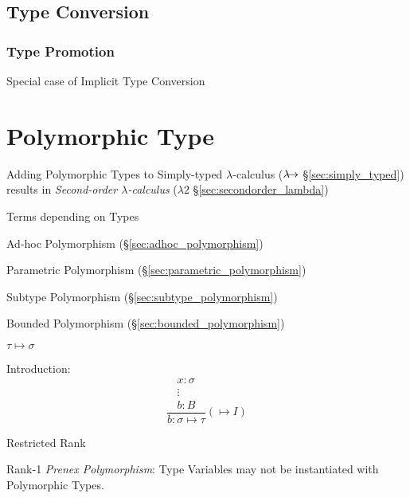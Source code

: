 \subsection{Type Conversion}\label{sec:type_conversion}

\subsubsection{Type Promotion}\label{sec:type_promotion}

Special case of Implicit Type Conversion



\section{Polymorphic Type}\label{sec:polymorphic_type}

Adding Polymorphic Types to Simply-typed $\lambda$-calculus
($\lambda\kern-5pt\rightarrow$ \S\ref{sec:simply_typed}) results in
\emph{Second-order $\lambda$-calculus} ($\lambda2$
\S\ref{sec:secondorder_lambda})

Terms depending on Types


Ad-hoc Polymorphism (\S\ref{sec:adhoc_polymorphism})

Parametric Polymorphism (\S\ref{sec:parametric_polymorphism})

Subtype Polymorphism (\S\ref{sec:subtype_polymorphism})

Bounded Polymorphism (\S\ref{sec:bounded_polymorphism})


\asterism


$\tau \mapsto \sigma$

Introduction:
\[
  {
  \frac{
    \begin{matrix}
      x : \sigma \\
      \vdots \\
      b : B
    \end{matrix}
  }
  {b : \sigma \mapsto \tau}
  }(\mapsto I)
\]


\asterism


Restricted Rank

Rank-1 \emph{Prenex Polymorphism}: Type Variables may not be
instantiated with Polymorphic Types.

